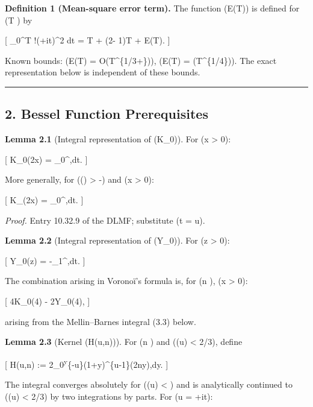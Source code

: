 \documentclass[
]{article}
\begin{document}
\textbf{Definition 1 (Mean-square error term).} The function (E(T)) is
defined for (T ) by

{[} \int\_0\^{}T
\left\textbar{}\zeta!\left(+it\right)\right\textbar\^{}2 dt
= T\log{} + (2\gamma - 1)T + E(T). \tag{*} {]}

Known bounds: (E(T) = O(T\^{}\{1/3+\varepsilon\})), (E(T) =
\Omega(T\^{}\{1/4\})). The exact representation below is independent of
these bounds.

\begin{center}\rule{0.5\linewidth}{0.5pt}\end{center}

\subsection{2. Bessel Function
Prerequisites}\label{bessel-function-prerequisites}

\textbf{Lemma 2.1} (Integral representation of (K\_0)). For (x
\textgreater{} 0):

{[} K\_0(2\pi x) =
\int\_0\^{}\infty {},dt.  {]}

More generally, for ((\nu) \textgreater{} -) and
(x \textgreater{} 0):

{[} K\_\nu(2\pi x) =
\int\_0\^{}\infty {},dt. 
{]}

\emph{Proof.} Entry 10.32.9 of the DLMF; substitute (t = \sinh u).

\textbf{Lemma 2.2} (Integral representation of (Y\_0)). For (z
\textgreater{} 0):

{[} Y\_0(z) =
-\int\_1\^{}\infty {},dt. {]}

The combination arising in Voronoï's formula is, for (n ), (x
\textgreater{} 0):

{[} 4K\_0(4\pi{}) - 2\pi Y\_0(4\pi{}), {]}

arising from the Mellin--Barnes integral (3.3) below.

\textbf{Lemma 2.3} (Kernel (H(u,n))). For (n ) and ((u)
\textless{} 2/3), define

{[} H(u,n) :=
2\int\_0\textsuperscript{\infty y}\{-u\}(1+y)\^{}\{u-1\}\cos(2\pi ny),dy.
 {]}

The integral converges absolutely for ((u) \textless{}
) and is analytically continued to ((u)
\textless{} 2/3) by two integrations by parts. For (u =
+it):
\end{document}
